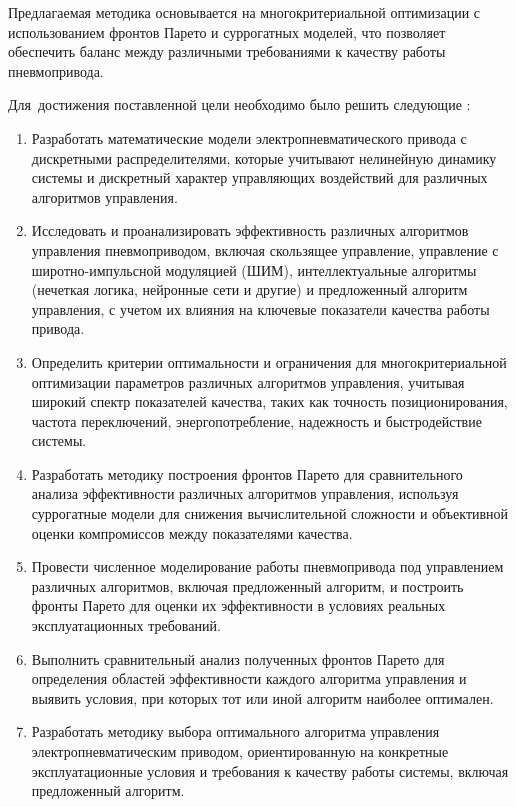 Предлагаемая методика основывается на многокритериальной оптимизации с использованием фронтов Парето
и суррогатных моделей, что позволяет обеспечить баланс между различными требованиями к качеству работы пневмопривода.

Для~достижения поставленной цели необходимо было решить следующие {\tasks}:
\begin{enumerate}[beginpenalty=10000] %
\item Разработать математические модели электропневматического привода с дискретными распределителями,
которые учитывают нелинейную динамику системы и дискретный характер управляющих воздействий для различных алгоритмов управления.

\item Исследовать и проанализировать эффективность различных алгоритмов управления пневмоприводом,
включая скользящее управление, управление с широтно-импульсной модуляцией (ШИМ),
интеллектуальные алгоритмы (нечеткая логика, нейронные сети и другие) и предложенный
алгоритм управления, с учетом их влияния на ключевые показатели качества работы привода.

\item Определить критерии оптимальности и ограничения для многокритериальной оптимизации
параметров различных алгоритмов управления, учитывая широкий спектр показателей качества,
таких как точность позиционирования, частота переключений, энергопотребление, надежность и быстродействие системы.

\item Разработать методику построения фронтов Парето для сравнительного анализа
эффективности различных алгоритмов управления, используя суррогатные модели для
снижения вычислительной сложности и объективной оценки компромиссов между показателями качества.

\item Провести численное моделирование работы пневмопривода под управлением различных алгоритмов,
включая предложенный алгоритм, и построить фронты Парето для оценки их эффективности в условиях реальных эксплуатационных требований.

\item Выполнить сравнительный анализ полученных фронтов Парето для определения областей эффективности каждого
алгоритма управления и выявить условия, при которых тот или иной алгоритм наиболее оптимален.

\item Разработать методику выбора оптимального алгоритма управления электропневматическим приводом,
ориентированную на конкретные эксплуатационные условия и требования к качеству работы системы, включая предложенный алгоритм.


\end{enumerate}
